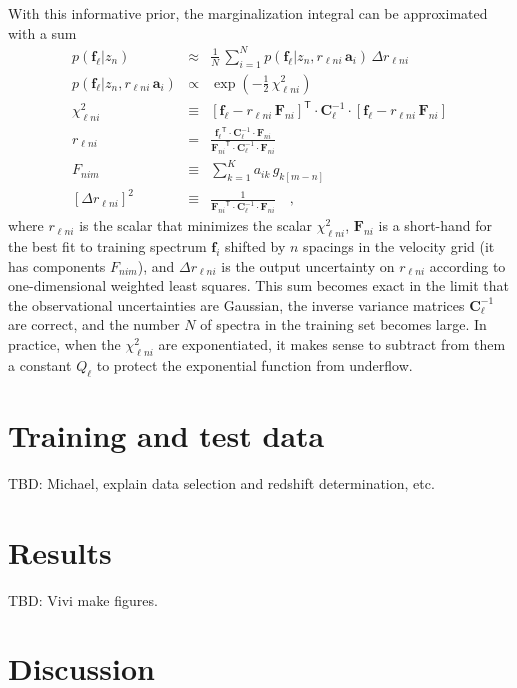 \documentclass[preprint]{aastex}
\newcommand{\mmatrix}[1]{\boldsymbol{#1}}
\newcommand{\inverse}[1]{{#1}^{-1}}
\newcommand{\transpose}[1]{{#1}^{\mathsf{T}}}
\newcommand{\covar}{\mmatrix{C}}
\newcommand{\avec}{\mmatrix{a}}
\newcommand{\fvec}{\mmatrix{f}}
\newcommand{\Fvec}{\mmatrix{F}}
\newcommand{\invvar}{\inverse{\covar}}
\begin{document}
With this informative prior, the marginalization integral can be
approximated with a sum
\begin{eqnarray}\displaystyle
p(\fvec_\ell|z_n) &\approx& \frac{1}{N}\,\sum_{i=1}^N p(\fvec_\ell|z_n,r_{\ell ni}\,\avec_i)\,\Delta r_{\ell ni} \nonumber\\
p(\fvec_\ell|z_n,r_{\ell ni}\,\avec_i) &\propto& \exp(-\frac{1}{2}\,\chi^2_{\ell ni}) \nonumber\\
\chi^2_{\ell ni} &\equiv& \transpose{[\fvec_\ell - r_{\ell ni}\,\Fvec_{ni}]}\cdot\invvar_\ell\cdot[\fvec_\ell - r_{\ell ni}\,\Fvec_{ni}] \nonumber\\
r_{\ell ni} &=& \frac{\transpose{\fvec_\ell}\cdot\invvar_\ell\cdot\Fvec_{ni}}{\transpose{\Fvec_{ni}}\cdot\invvar_\ell\cdot\Fvec_{ni}} \nonumber\\
F_{nim} &\equiv& \sum_{k=1}^K a_{ik}\,g_{k[m-n]} \nonumber\\
{}[\Delta r_{\ell ni}]^2 &\equiv& \frac{1}{\transpose{\Fvec_{ni}}\cdot\invvar_\ell\cdot\Fvec_{ni}}
\quad ,
\end{eqnarray}
where $r_{\ell ni}$ is the scalar that minimizes the scalar
$\chi^2_{\ell ni}$, $\Fvec_{ni}$ is a short-hand for the best fit to
training spectrum $\fvec_i$ shifted by $n$ spacings in the velocity
grid (it has components $F_{nim}$), and $\Delta r_{\ell ni}$ is the
output uncertainty on $r_{\ell ni}$ according to one-dimensional
weighted least squares.  This sum becomes exact in the limit that the
observational uncertainties are Gaussian, the inverse variance
matrices $\invvar_\ell$ are correct, and the number $N$ of spectra in
the training set becomes large.  In practice, when the $\chi^2_{\ell n
  i}$ are exponentiated, it makes sense to subtract from them a
constant $Q_\ell$ to protect the exponential function from underflow.

\section{Training and test data}

TBD:  Michael, explain data selection and redshift determination, etc.

\section{Results}

TBD:  Vivi make figures.

\section{Discussion}
\end{document}
